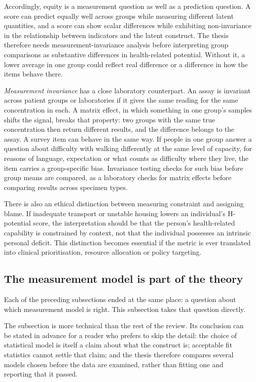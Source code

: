 Accordingly, equity is a measurement question as well as a prediction question. A score can predict equally well across groups while measuring different latent quantities, and a score can show scalar differences while exhibiting non-invariance in the relationship between indicators and the latent construct. The thesis therefore needs measurement-invariance analysis before interpreting group comparisons as substantive differences in health-related potential. Without it, a lower average in one group could reflect real difference or a difference in how the items behave there.

\emph{Measurement invariance} has a close laboratory counterpart. An assay is invariant across patient groups or laboratories if it gives the same reading for the same concentration in each. A matrix effect, in which something in one group's samples shifts the signal, breaks that property: two groups with the same true concentration then return different results, and the difference belongs to the assay. A survey item can behave in the same way. If people in one group answer a question about difficulty with walking differently at the same level of capacity, for reasons of language, expectation or what counts as difficulty where they live, the item carries a group-specific bias. Invariance testing checks for such bias before group means are compared, as a laboratory checks for matrix effects before comparing results across specimen types.

There is also an ethical distinction between measuring constraint and assigning blame. If inadequate transport or unstable housing lowers an individual's H-potential score, the interpretation should be that the person's health-related capability is constrained by context, not that the individual possesses an intrinsic personal deficit. This distinction becomes essential if the metric is ever translated into clinical prioritisation, resource allocation or policy targeting.

\subsection{The measurement model is part of the theory}

Each of the preceding subsections ended at the same place: a question about which measurement model is right. This subsection takes that question directly.

The subsection is more technical than the rest of the review. Its conclusion can be stated in advance for a reader who prefers to skip the detail: the choice of statistical model is itself a claim about what the construct is; acceptable fit statistics cannot settle that claim; and the thesis therefore compares several models chosen before the data are examined, rather than fitting one and reporting that it passed.

